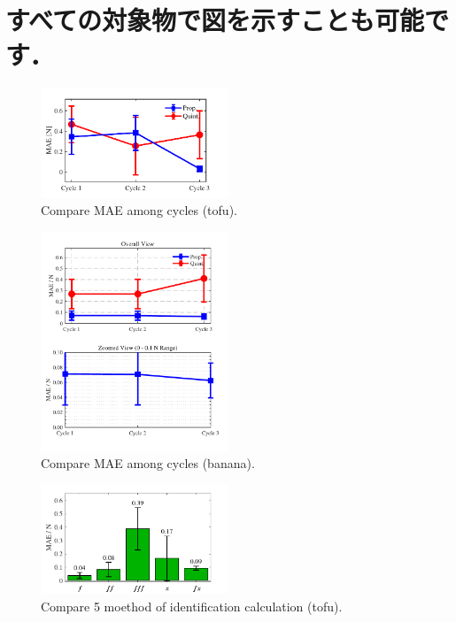 \documentclass[a4paper]{jarticle}
\begin{document}
\section*{すべての対象物で図を示すことも可能です．}
\begin{figure}[H]
    \centering
    \includegraphics[width=0.5\textwidth]{tofu_compare_cycle_MAE.pdf}
    \caption{Compare MAE among cycles (tofu).}
    \label{fig:tofu_compare_cycle_MAE}
\end{figure}
\begin{figure}[H]
    \centering
    \includegraphics[width=0.5\textwidth]{banana_compare_cycle_MAE.pdf}
    \caption{Compare MAE among cycles (banana).}
    \label{fig:banana_compare_cycle_MAE}
\end{figure}
\begin{figure}[H]
    \centering
    \includegraphics[width=0.5\textwidth]{select_differet_q_tofu.pdf}
    \captionsetup{width=0.9\linewidth} %
    \caption{Compare 5 moethod of identification calculation (tofu).}
    \label{fig:compare_select5mode(tofu)}
\end{figure}
\end{document}
